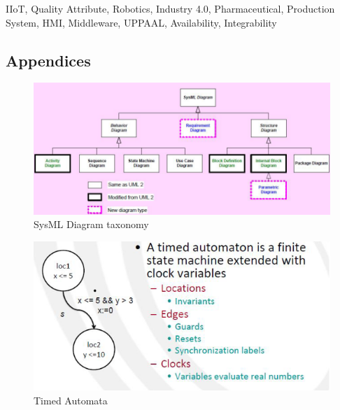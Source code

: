 \documentclass[conference]{IEEEtran}
\begin{document}
\maketitle
\IEEEpubidadjcol

\begin{IEEEkeywords}
IIoT, Quality Attribute, Robotics, Industry 4.0, Pharmaceutical, Production System, HMI, Middleware, UPPAAL, Availability, Integrability
\end{IEEEkeywords}















\begin{appendices}
\section{Appendices}

\begin{figure}[h]
    \centering
    \includegraphics[width=2\linewidth]{images/diagrams.png}
    \caption{SysML Diagram taxonomy \cite{Diagram}}
    \label{SysMLDiagram}
\end{figure}

\pagebreak

\begin{figure}[h]
    \centering
    \includegraphics[width=1\linewidth]{images/timedautomata.png}
    \caption{Timed Automata \cite{TimedAutomata}}
    \label{fig:TimedAutomata}
\end{figure}

\end{appendices}
\vspace{12pt}
\end{document}
